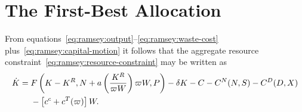 \section{The First-Best Allocation}
\label{sec:first-best-allocation}

From equations~\eqref{eq:ramsey:output}--\eqref{eq:ramsey:waste-cost} plus~\eqref{eq:ramsey:capital-motion} it follows that the aggregate resource constraint~\eqref{eq:ramsey:resource-constraint} may be written as
\begin{align}
\dot{K} &= F\left(K-K^R, N + a\left(\frac{K^R}{\varpi W}\right)\varpi W, P\right) - \delta K - C - C^N(N,S) - C^D(D,X) 
\notag \\
&\phantom{{}={}} - \left[c^c + c^T(\varpi)\right] W.
\label{eq:first-best:capital-constraint}
\end{align}

